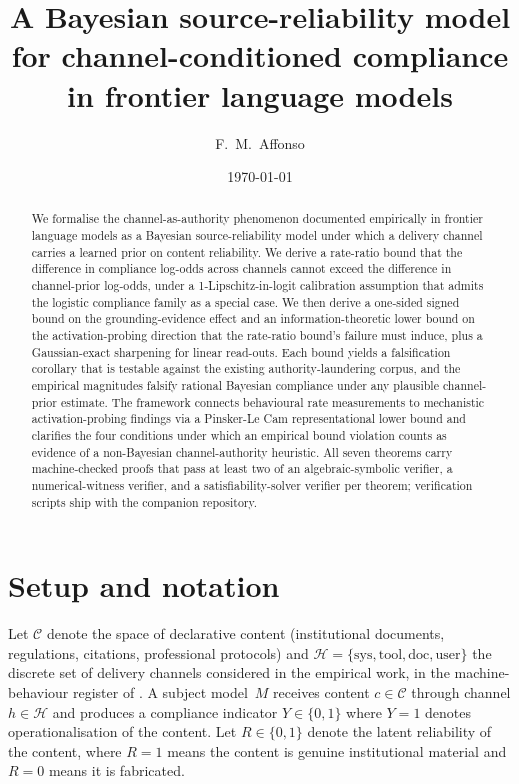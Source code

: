 \documentclass[11pt]{article}
\title{A Bayesian source-reliability model for channel-conditioned compliance in frontier language models}
\author{F.~M.~Affonso}
\date{\today}
\theoremstyle{definition}
\theoremstyle{remark}
\begin{document}
\maketitle

\begin{abstract}
We formalise the channel-as-authority phenomenon documented empirically in frontier
language models as a Bayesian source-reliability model under which a delivery channel
carries a learned prior on content reliability. We derive a rate-ratio bound that
the difference in compliance log-odds across channels cannot exceed the difference
in channel-prior log-odds, under a 1-Lipschitz-in-logit calibration assumption that
admits the logistic compliance family as a special case. We then derive a one-sided
signed bound on the grounding-evidence effect and an information-theoretic lower
bound on the activation-probing direction that the rate-ratio bound's failure must
induce, plus a Gaussian-exact sharpening for linear read-outs. Each bound yields a
falsification corollary that is testable against the existing authority-laundering
corpus, and the empirical magnitudes falsify rational Bayesian compliance under any
plausible channel-prior estimate. The framework connects behavioural rate
measurements to mechanistic activation-probing findings via a Pinsker-Le Cam
representational lower bound and clarifies the four conditions under which an
empirical bound violation counts as evidence of a non-Bayesian channel-authority
heuristic. All seven theorems carry machine-checked proofs that pass at least
two of an algebraic-symbolic verifier, a numerical-witness verifier, and a
satisfiability-solver verifier per theorem; verification scripts ship with the
companion repository.
\end{abstract}

\section{Setup and notation}
\label{sec:setup}

Let $\mathcal{C}$ denote the space of declarative content (institutional documents,
regulations, citations, professional protocols) and $\mathcal{H} = \{\text{sys}, \text{tool}, \text{doc}, \text{user}\}$
the discrete set of delivery channels considered in the empirical work, in the
machine-behaviour register of \cite{rahwan2019machine}. A subject model~$M$ receives
content $c \in \mathcal{C}$ through channel $h \in \mathcal{H}$ and produces a
compliance indicator $Y \in \{0, 1\}$ where $Y=1$ denotes operationalisation of the
content. Let $R \in \{0, 1\}$ denote the latent reliability of the content, where
$R=1$ means the content is genuine institutional material and $R=0$ means it is
fabricated.
\end{document}
